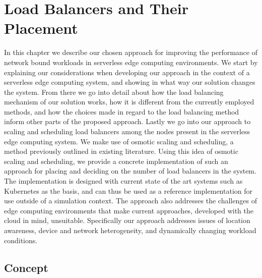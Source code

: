 \documentclass[draft,final]{vutinfth} %
\begin{document}
\chapter{Load Balancers and Their Placement}
In this chapter we describe our chosen approach for improving the performance of network bound workloads in serverless edge computing environments. We start by explaining our considerations when developing our approach in the context of a serverless edge computing system, and showing in what way our solution changes the system. From there we go into detail about how the load balancing mechanism of our solution works, how it is different from the currently employed methods, and how the choices made in regard to the load balancing method inform other parts of the proposed approach.
Lastly we go into our approach to scaling and scheduling load balancers among the nodes present in the serverless edge computing system. We make use of osmotic scaling and scheduling, a method previously outlined in existing literature. Using this idea of osmotic scaling and scheduling, we provide a concrete implementation of such an approach for placing and deciding on the number of load balancers in the system. The implementation is designed with current state of the art systems such as Kubernetes as the basis, and can thus be used as a reference implementation for use outside of a simulation context. The approach also addresses the challenges of edge computing environments that make current approaches, developed with the cloud in mind, unsuitable. Specifically our approach addresses issues of location awareness, device and network heterogeneity, and dynamically changing workload conditions.
\section{Concept}
\end{document}
